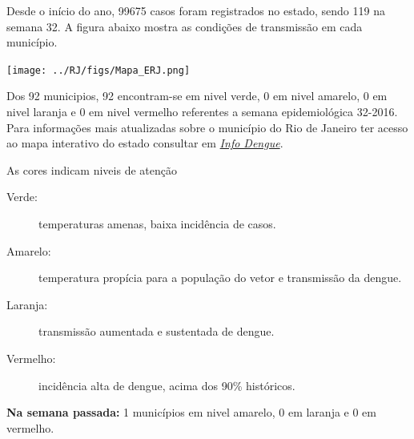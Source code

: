 \documentclass[10pt]{article} %
\begin{document}
\begin{minipage}[t]{.66\linewidth} %

  \hypertarget{estado}{} %

Desde o início do ano, 99675 casos foram registrados no estado, sendo 119 na semana 32. A figura abaixo mostra as condições de transmissão em cada município.

\texttt{[image: ../RJ/figs/Mapa\_ERJ.png]}
  
  Dos 92 municipios, 92 encontram-se em nivel verde, 0 em nivel amarelo, 0 em nivel laranja e 0 em nivel vermelho referentes a semana epidemiológica 32-2016. Para informações mais atualizadas
sobre o município do Rio de Janeiro ter acesso ao mapa interativo do estado consultar em \href{http://info.dengue.mat.br}{\textit{Info Dengue}}.


  \vspace{1cm}
\begin{mdframed}[style=intextbox,frametitle={}] %

\hypertarget{descriptivebox}{} %
As cores indicam niveis de atenção
\begin{description}
\item[Verde:] temperaturas amenas, baixa incidência de casos.      
\item[Amarelo:] temperatura propícia para a população do vetor e transmissão da dengue.
\item[Laranja:] transmissão aumentada e sustentada de dengue. 
\item[Vermelho:] incidência alta de dengue, acima dos 90\% históricos.
\end{description}
\end{mdframed}

\textbf{Na semana passada:} 1 municípios em nivel amarelo, 0 em laranja e 0 em vermelho.  

\end{minipage} %
\end{document}
